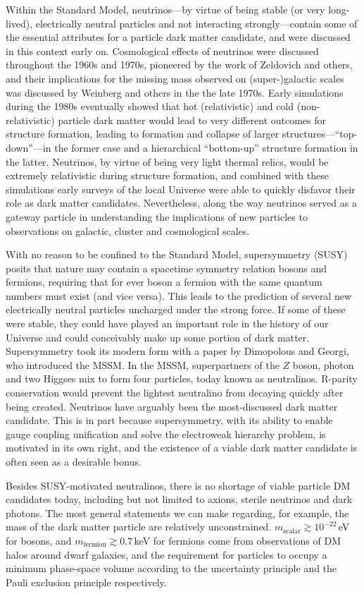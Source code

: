 Within the Standard Model, neutrinos---by virtue of being stable (or very long-lived), electrically neutral particles and not interacting strongly---contain some of the essential attributes for a particle dark matter candidate, and were discussed in this context early on. Cosmological effects of neutrinos were discussed throughout the 1960s and 1970s, pioneered by the work of Zeldovich and others, and their implications for the missing mass observed on (super-)galactic scales was discussed by Weinberg and others in the the late 1970s. Early simulations during the 1980s eventually showed that hot (relativistic) and cold (non-relativistic) particle dark matter would lead to very different outcomes for structure formation, leading to formation and collapse of larger structures---``top-down''---in the former case and a hierarchical ``bottom-up'' structure formation in the latter. Neutrinos, by virtue of being very light thermal relics, would be extremely relativistic during structure formation, and combined with these simulations early surveys of the local Universe were able to quickly disfavor their role as dark matter candidates. Nevertheless, along the way neutrinos served as a gateway particle in understanding the implications of new particles to observations on galactic, cluster and cosmological scales.

With no reason to be confined to the Standard Model, supersymmetry (SUSY) posits that nature may contain a spacetime symmetry relation bosons and fermions, requiring that for ever boson a fermion with the same quantum numbers must exist (and vice versa). This leads to the prediction of several new electrically neutral particles uncharged under the strong force. If some of these were stable, they could have played an important role in the history of our Universe and could conceivably make up some portion of dark matter. Supersymmetry took its modern form with a paper by Dimopolous and Georgi, who introduced the MSSM. In the MSSM, superpartners of the $Z$ boson, photon and two Higgses mix to form four particles, today known as neutralinos. R-parity conservation would prevent the lightest neutralino from decaying quickly after being created. Neutrinos have arguably been the most-discussed dark matter candidate. This is in part because supersymmetry, with its ability to enable gauge coupling unification and solve the electroweak hierarchy problem, is motivated in its own right, and the existence of a viable dark matter candidate is often seen as a desirable bonus.

Besides SUSY-motivated neutralinos, there is no shortage of viable particle DM candidates today, including but not limited to axions, sterile neutrinos and dark photons. The most general statements we can make regarding, for example, the mass of the dark matter particle are relatively unconstrained. $m_\text{scalar} \gtrsim 10^{-22}$\,eV for bosons, and $m_\text{fermion} \gtrsim 0.7$\,keV for fermions come from observations of DM halos around dwarf galaxies, and the requirement for particles to occupy a minimum phase-space volume according to the uncertainty principle and the Pauli exclusion principle respectively.

